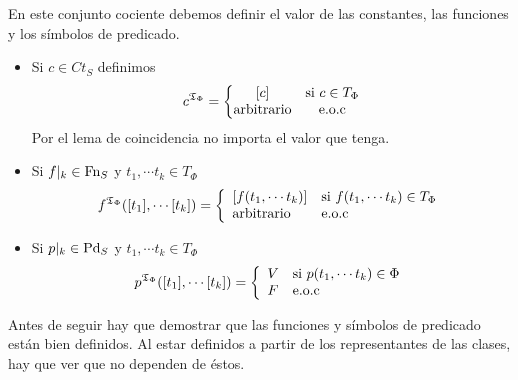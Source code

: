 En este conjunto cociente debemos definir el valor de las constantes, las funciones y los símbolos de predicado.
\begin{itemize}
\item Si $c\in Ct_{S}$ definimos
  \[ c^{\mathfrak{T}_{\Phi}}=\left\{
      \begin{matrix}
        [c] & \mbox{si}\ c\in T_{\Phi}\\
        \mbox{arbitrario} & \mbox{e.o.c}
      \end{matrix}
    \right. \]
  Por el lema de coincidencia no importa el valor que tenga.

\item Si $f|_{k}\in \mbox{Fn}_{S}$ y $t_{1},\cdots t_{k}\in T_{\Phi}$
  \[ f^{\mathfrak{T}_{\Phi}}([t_{1}],\cdots [t_{k}])=\left\{
      \begin{array}{ll}
        [f(t_{1},\cdots t_{k})]& \mbox{si}\ f(t_{1},\cdots t_{k})\in
                                 T_{\Phi}\\
        \mbox{arbitrario} & \mbox{e.o.c}
      \end{array}
    \right. \]
\item Si $p|_{k}\in \mbox{Pd}_{S}$ y $t_{1},\cdots t_{k}\in T_{\Phi}$
  \[ p^{\mathfrak{T}_{\Phi}}([t_{1}],\cdots [t_{k}])=\left\{
      \begin{array}{ll}
        V & \mbox{si}\ p(t_{1},\cdots t_{k})\in\Phi\\
        F & \mbox{e.o.c}
      \end{array}
    \right. \]
\end{itemize}

Antes de seguir hay que demostrar que las funciones y símbolos de predicado están bien definidos. Al estar definidos a partir de los representantes de las clases, hay que ver que no dependen de éstos.

